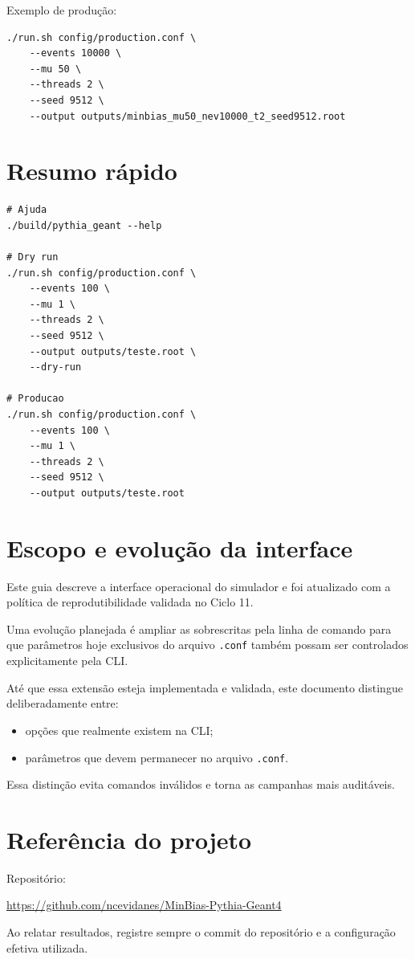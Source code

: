 \documentclass[11pt,a4paper]{article}
\begin{document}
Exemplo de produção:

\begin{lstlisting}[style=shell]
./run.sh config/production.conf \
    --events 10000 \
    --mu 50 \
    --threads 2 \
    --seed 9512 \
    --output outputs/minbias_mu50_nev10000_t2_seed9512.root
\end{lstlisting}

\section{Resumo rápido}

\begin{lstlisting}[style=shell]
# Ajuda
./build/pythia_geant --help

# Dry run
./run.sh config/production.conf \
    --events 100 \
    --mu 1 \
    --threads 2 \
    --seed 9512 \
    --output outputs/teste.root \
    --dry-run

# Producao
./run.sh config/production.conf \
    --events 100 \
    --mu 1 \
    --threads 2 \
    --seed 9512 \
    --output outputs/teste.root
\end{lstlisting}

\section{Escopo e evolução da interface}

Este guia descreve a interface operacional do simulador e foi atualizado
com a política de reprodutibilidade validada no Ciclo 11.

Uma evolução planejada é ampliar as sobrescritas pela linha de comando para que
parâmetros hoje exclusivos do arquivo \texttt{.conf} também possam ser
controlados explicitamente pela CLI.

Até que essa extensão esteja implementada e validada, este documento distingue
deliberadamente entre:

\begin{itemize}
  \item opções que realmente existem na CLI;
  \item parâmetros que devem permanecer no arquivo \texttt{.conf}.
\end{itemize}

Essa distinção evita comandos inválidos e torna as campanhas mais auditáveis.

\section{Referência do projeto}

Repositório:

\begin{center}
\url{https://github.com/ncevidanes/MinBias-Pythia-Geant4}
\end{center}

Ao relatar resultados, registre sempre o commit do repositório e a configuração
efetiva utilizada.
\end{document}
